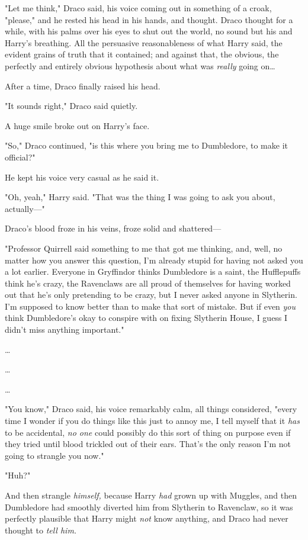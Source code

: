 "Let me think," Draco said, his voice coming out in something of a croak,
"please," and he rested his head in his hands, and thought.
\later
Draco thought for a while, with his palms over his eyes to shut out the world,
no sound but his and Harry’s breathing. All the persuasive reasonableness of
what Harry said, the evident grains of truth that it contained; and against
that, the obvious, the perfectly and entirely obvious hypothesis about what was
\emph{really} going on…

After a time, Draco finally raised his head.

"It sounds right," Draco said quietly.

A huge smile broke out on Harry’s face.

"So," Draco continued, "is this where you bring me to Dumbledore, to make it
official?"

He kept his voice very casual as he said it.

"Oh, yeah," Harry said. "That was the thing I was going to ask you about,
actually—"

Draco’s blood froze in his veins, froze solid and shattered—

"Professor Quirrell said something to me that got me thinking, and, well, no
matter how you answer this question, I’m already stupid for having not asked
you a lot earlier. Everyone in Gryffindor thinks Dumbledore is a saint, the
Hufflepuffs think he’s crazy, the Ravenclaws are all proud of themselves for
having worked out that he’s only pretending to be crazy, but I never asked
anyone in Slytherin. I’m supposed to know better than to make that sort of
mistake. But if even \emph{you} think Dumbledore’s okay to conspire with on
fixing Slytherin House, I guess I didn’t miss anything important."

…

…

…

"You know," Draco said, his voice remarkably calm, all things considered,
"every time I wonder if you do things like this just to annoy me, I tell myself
that it \emph{has} to be accidental, \emph{no one} could possibly do this sort
of thing on purpose even if they tried until blood trickled out of their ears.
That’s the only reason I’m not going to strangle you now."

"Huh?"

And then strangle \emph{himself,} because Harry \emph{had} grown up with
Muggles, and then Dumbledore had smoothly diverted him from Slytherin to
Ravenclaw, so it was perfectly plausible that Harry might \emph{not} know
anything, and Draco had never thought to \emph{tell him.}

